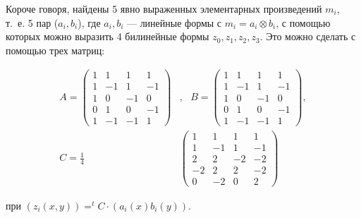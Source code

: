\documentclass{mai_book}
\begin{document}
Короче говоря, найдены 5 явно выраженных элементарных произведений $m_i$, т.~е. 5 пар ($a_i, b_i$), где $a_i,b_i$ --- линейные формы с $m_i=a_i \otimes b_i$, с помощью которых можно выразить 4 билинейные формы $z_0,z_1,z_2,z_3$. Это можно сделать с помощью трех матриц:
\begin{center}
  \begin{equation} \label{n9}
    \begin{split}
      A=\begin{pmatrix} 1 & 1 & 1 & 1 \\ 1 & -1 & 1 & -1 \\ 1 & 0 & -1 & 0 \\ 0 & 1 & 0 & -1 \\ 1& -1 & -1 & 1 \end{pmatrix}&,\ \ \ B=\begin{pmatrix} 1 & 1 & 1 & 1 \\ 1 & -1 & 1 & -1 \\ 1 & 0 & -1 & 0 \\ 0 & 1 & 0 & -1 \\ 1& -1 & -1 & 1 \end{pmatrix}, \\ C=\frac{1}{4} &\begin{pmatrix} 1 & 1 & 1 & 1 \\ 1 & -1 & 1 & -1 \\ 2 & 2 & -2 & -2 \\ -2 & 2 & 2 & -2 \\ 0 & -2 & 0 & 2 \end{pmatrix}
    \end{split}
\end{equation}
\end{center}
\noindent
при $(z_i(x,y))= ^t C \cdot (a_i(x)b_i(y))$.\par
\end{document}
